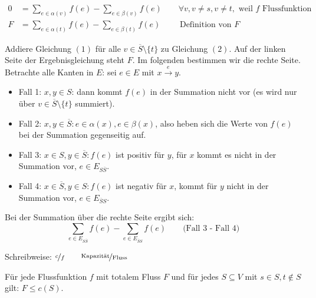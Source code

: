 \begin{beweis}
    \setcounter{equation}{0}
    \begin{align}
        0 &= \sum_{e \in \alpha(v)} f(e) - \sum_{e \in \beta(v)} f(e) \qquad
          \forall v, v \neq s, v \neq t, \text{ weil $f$ Flussfunktion} \\
        F &= \sum_{e \in \alpha(t)} f(e) - \sum_{e \in \beta(t)} f(e) \qquad
        \text{ Definition von $F$}
    \end{align}

    Addiere Gleichung $(1)$ für alle $v \in \overline{S} \setminus \{t\}$ zu
    Gleichung $(2)$. Auf der linken Seite der Ergebnisgleichung steht $F$. Im
    folgenden bestimmen wir die rechte Seite. Betrachte alle Kanten in $E$: sei
    $e \in E$ mit $x \stackrel{e}{\rightarrow} y$.
    \begin{itemize}
        \item Fall 1: $x, y \in S$: dann kommt $f(e)$ in der Summation nicht
            vor (es wird nur über $v \in \overline{S} \setminus \{t\}$ summiert).
        \item Fall 2: $x, y \in \overline{S}: e \in \alpha(x), e \in \beta(x)$,
            also heben sich die Werte von $f(e)$ bei der Summation gegenseitig auf.
        \item Fall 3: $x \in S, y \in \overline{S}: f(e)$ ist positiv für $y$,
            für $x$ kommt es nicht in der Summation vor, $e \in E_{S\overline{S}}$.
        \item Fall 4: $x \in \overline{S}, y \in S: f(e)$ ist negativ für $x$,
            kommt für $y$ nicht in der Summation vor, $e \in E_{\overline{S}S}$.
    \end{itemize}

    Bei der Summation über die rechte Seite ergibt sich: $$ \sum_{e \in
    E_{S\overline{S}}} f(e) - \sum_{e \in E_{\overline{S}S}} f(e) \qquad
    \text{(Fall 3 - Fall 4)}$$
\end{beweis}


\begin{beispiel}
    Schreibweise: $\nicefrac{c}{f} \qquad \nicefrac{\text{Kapazität}}{\text{Fluss}}$
\end{beispiel}


\begin{lemma}
    \label{flusskleinerkap}
    Für jede Flussfunktion $f$ mit totalem Fluss $F$ und für jedes $S \subseteq
    V$ mit $s \in S, t \notin S$ gilt: $F \leq c(S)$.
\end{lemma}



